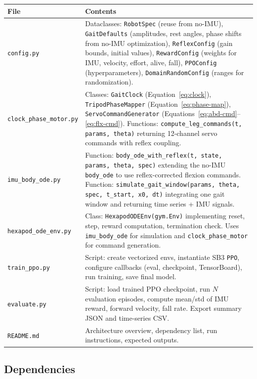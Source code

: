 \documentclass[11pt]{article}
\begin{document}
\begin{longtable}{p{4.8cm}p{9cm}}
\toprule
\textbf{File} & \textbf{Contents} \\
\midrule
\endhead
\texttt{config.py} & Dataclasses: \texttt{RobotSpec} (reuse from no-IMU), \texttt{GaitDefaults} (amplitudes, rest angles, phase shifts from no-IMU optimization), \texttt{ReflexConfig} (gain bounds, initial values), \texttt{RewardConfig} (weights for IMU, velocity, effort, alive, fall), \texttt{PPOConfig} (hyperparameters), \texttt{DomainRandomConfig} (ranges for randomization). \\
\addlinespace
\texttt{clock\_phase\_motor.py} & Classes: \texttt{GaitClock} (Equation~\eqref{eq:clock}), \texttt{TripodPhaseMapper} (Equation~\eqref{eq:phase-map}), \texttt{ServoCommandGenerator} (Equations~\eqref{eq:abd-cmd}--\eqref{eq:flx-cmd}). Functions: \texttt{compute\_leg\_commands(t, params, theta)} returning 12-channel servo commands with reflex coupling. \\
\addlinespace
\texttt{imu\_body\_ode.py} & Function: \texttt{body\_ode\_with\_reflex(t, state, params, theta, spec)} extending the no-IMU \texttt{body\_ode} to use reflex-corrected flexion commands. Function: \texttt{simulate\_gait\_window(params, theta, spec, t\_start, x0, dt)} integrating one gait window and returning time series + IMU signals. \\
\addlinespace
\texttt{hexapod\_ode\_env.py} & Class: \texttt{HexapodODEEnv(gym.Env)} implementing reset, step, reward computation, termination check. Uses \texttt{imu\_body\_ode} for simulation and \texttt{clock\_phase\_motor} for command generation. \\
\addlinespace
\texttt{train\_ppo.py} & Script: create vectorized envs, instantiate SB3 \texttt{PPO}, configure callbacks (eval, checkpoint, TensorBoard), run training, save final model. \\
\addlinespace
\texttt{evaluate.py} & Script: load trained PPO checkpoint, run $N$ evaluation episodes, compute mean/std of IMU reward, forward velocity, fall rate. Export summary JSON and time-series CSV. \\
\addlinespace
\texttt{README.md} & Architecture overview, dependency list, run instructions, expected outputs. \\
\bottomrule
\end{longtable}

\subsection{Dependencies}
\end{document}
